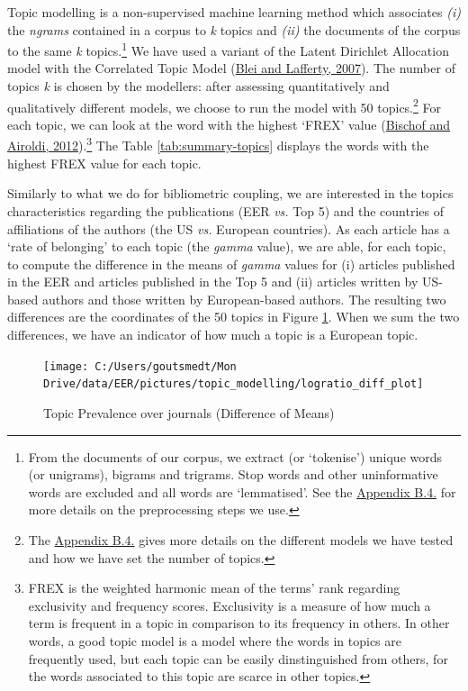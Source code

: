 \documentclass[]{elsarticle} %
\begin{document}
Topic modelling is a non-supervised machine learning method which
associates \emph{(i)} the \emph{ngrams} contained in a corpus to
\emph{k} topics and \emph{(ii)} the documents of the corpus to the same
\emph{k} topics.\footnote{From the documents of our corpus, we extract
  (or `tokenise') unique words (or unigrams), bigrams and trigrams. Stop
  words and other uninformative words are excluded and all words are
  `lemmatised'. See the \protect\hyperlink{topic}{Appendix B.4.} for
  more details on the preprocessing steps we use.} We have used a
variant of the Latent Dirichlet Allocation model with the Correlated
Topic Model (\protect\hyperlink{ref-blei2007}{Blei and Lafferty, 2007}).
The number of topics \emph{k} is chosen by the modellers: after
assessing quantitatively and qualitatively different models, we choose
to run the model with 50 topics.\footnote{The
  \protect\hyperlink{topic}{Appendix B.4.} gives more details on the
  different models we have tested and how we have set the number of
  topics.} For each topic, we can look at the word with the highest
`FREX' value (\protect\hyperlink{ref-bischof2012}{Bischof and Airoldi,
2012}).\footnote{FREX is the weighted harmonic mean of the terms' rank
  regarding exclusivity and frequency scores. Exclusivity is a measure
  of how much a term is frequent in a topic in comparison to its
  frequency in others. In other words, a good topic model is a model
  where the words in topics are frequently used, but each topic can be
  easily dinstinguished from others, for the words associated to this
  topic are scarce in other topics.} The Table \ref{tab:summary-topics}
displays the words with the highest FREX value for each topic.

Similarly to what we do for bibliometric coupling, we are interested in
the topics characteristics regarding the publications (EER \emph{vs.}
Top 5) and the countries of affiliations of the authors (the US
\emph{vs.} European countries). As each article has a `rate of
belonging' to each topic (the \emph{gamma} value), we are able, for each
topic, to compute the difference in the means of \emph{gamma} values for
(i) articles published in the EER and articles published in the Top 5
and (ii) articles written by US-based authors and those written by
European-based authors. The resulting two differences are the
coordinates of the 50 topics in Figure \ref{fig:plot-topic-diff}. When
we sum the two differences, we have an indicator of how much a topic is
a European topic.

\begin{figure}[h]

{\centering \texttt{[image: C:/Users/goutsmedt/Mon Drive/data/EER/pictures/topic\_modelling/logratio\_diff\_plot]} 

}

\caption{Topic Prevalence over journals (Difference of Means)}\label{fig:plot-topic-diff}
\end{figure}
\end{document}
